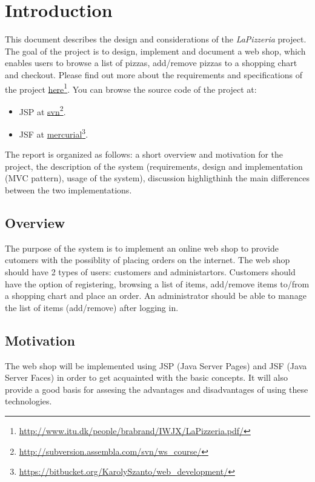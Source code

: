 \section{Introduction}
\label{sec.introduction}
This document describes the design and considerations of the \emph{LaPizzeria}
project. The goal of the project is to design, implement and document a web
shop, which enables users to browse a list of pizzas, add/remove pizzas to a
shopping chart and checkout. Please find out more about the requirements and specifications of the project
\href{http://www.itu.dk/people/brabrand/IWJX/LaPizzeria.pdf}{here}\footnote{\url{http://www.itu.dk/people/brabrand/IWJX/LaPizzeria.pdf/}}.
You can browse the source code of the project at:
\begin{itemize}
  \item
  JSP at
  \href{http://subversion.assembla.com/svn/ws_course/}{svn}\footnote{\url{http://subversion.assembla.com/svn/ws_course/}}.
  \item JSF at
  \href{https://bitbucket.org/KarolySzanto/web_development}{mercurial}\footnote{\url{https://bitbucket.org/KarolySzanto/web_development/}}.
\end{itemize}
The report is organized as follows: a short overview and motivation for the
project, the description of the system (requirements, design and
implementation (MVC pattern), usage of the system), discussion highligthinh the
main differences between the two implementations.

\subsection{Overview}
\label{sec.introduction.overview}
The purpose of the system is to implement an online web shop to provide cutomers
with the possiblity of placing orders on the internet. The web shop
should have 2 types of users: customers and administartors. Customers should
have the option of registering, browsing a list of items, add/remove items to/from a shopping chart
and place an order. An administrator should be able to manage the list of items
(add/remove) after logging in.
\subsection{Motivation}
\label{sec.introduction.motivation}
The web shop will be implemented using JSP (Java Server Pages) and JSF (Java
Server Faces) in order to get acquainted with the basic concepts. It will also provide a good basis for assesing the
advantages and disadvantages of using these technologies.
